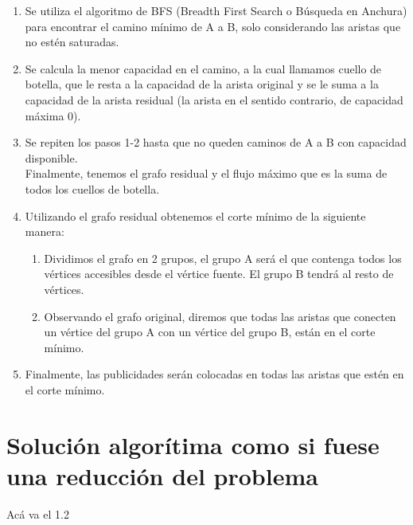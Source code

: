 \begin{enumerate}
\item Se utiliza el algoritmo de BFS (Breadth First Search o Búsqueda en Anchura) para encontrar el camino mínimo de A a B, solo considerando las aristas que no estén saturadas. \\



\item Se calcula la menor capacidad en el camino, a la cual llamamos cuello de botella, que le resta a la capacidad de la arista original y se le suma a la capacidad de la arista residual (la arista en el sentido contrario, de capacidad máxima 0). \\



\item Se repiten los pasos 1-2 hasta que no queden caminos de A a B con capacidad disponible. \\



Finalmente, tenemos el grafo residual y el flujo máximo que es la suma de todos los cuellos de botella. \\
\item Utilizando el grafo residual obtenemos el corte mínimo de la siguiente manera: \\
    \begin{enumerate}
    \item Dividimos el grafo en 2 grupos, el grupo A será el que contenga todos los vértices accesibles desde el vértice fuente. El grupo B tendrá al resto de vértices. \\
    \item Observando el grafo original, diremos que todas las aristas que conecten un vértice del grupo A con un vértice del grupo B, están en el corte mínimo. \\
    \end{enumerate}

\item Finalmente, las publicidades serán colocadas en todas las aristas que estén en el corte mínimo.
\end{enumerate}

\section{Solución algorítima como si fuese una reducción del problema} Acá va el 1.2
